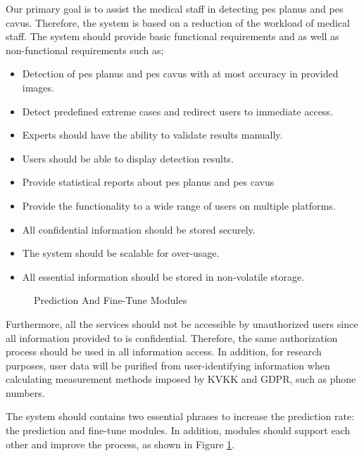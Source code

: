 Our primary goal is to assist the medical staff in detecting pes planus and pes cavus. Therefore, the system is based on a reduction of the workload of medical staff. The system should provide basic functional requirements and as well as non-functional requirements such as;
\begin{itemize}
  \item Detection of pes planus and pes cavus with at most accuracy in provided images.
  \item Detect predefined extreme cases and redirect users to immediate access.
  \item Experts should have the ability to validate results manually.
  \item Users should be able to display detection results.
  \item Provide statistical reports about pes planus and pes cavus 
  \item Provide the functionality to a wide range of users on multiple platforms.
  \item All confidential information should be stored securely.
  \item The system should be scalable for over-usage.
  \item All essential information should be stored in non-volatile storage.
\end{itemize}

\begin{figure}[htbp]
\centering
{}
\caption{Prediction And Fine-Tune Modules}
\label{fig:PredictionAndFinetuneModules}
\end{figure}

Furthermore, all the services should not be accessible by unauthorized users since all information provided to is confidential. Therefore, the same authorization process should be used in all information access. In addition, for research purposes, user data will be purified from user-identifying information when calculating measurement methods imposed by KVKK and GDPR, such as phone numbers.

The system should contains two essential phrases to increase the prediction rate: the prediction and fine-tune modules. In addition, modules should support each other and improve the process, as shown in Figure \ref{fig:PredictionAndFinetuneModules}.

